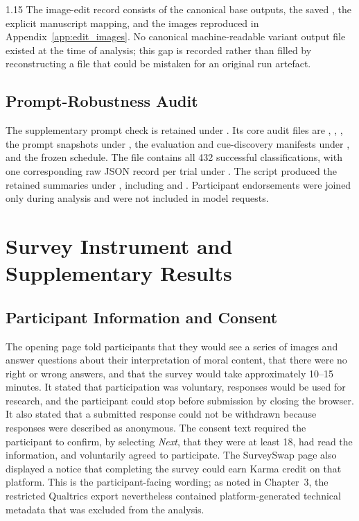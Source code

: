 \begin{spacing}{1.15}
The image-edit record consists of the canonical base outputs, the saved
, the explicit manuscript mapping,
and the images reproduced in Appendix~\ref{app:edit_images}. No canonical
machine-readable variant output file existed at the time of analysis; this gap
is recorded rather than filled by reconstructing a file that could be mistaken
for an original run artefact.

\section{Prompt-Robustness Audit}

The supplementary prompt check is retained under
. Its core audit files are
, ,
, the prompt snapshots under , the
evaluation and cue-discovery manifests under , and the frozen
schedule. The file  contains all
432 successful classifications, with one corresponding raw JSON record per
trial under . The script
 produced the retained summaries under
, including  and
. Participant endorsements were joined only during
analysis and were not included in model requests.
\end{spacing}


\chapter{Survey Instrument and Supplementary Results}
\label{app:survey_supplement}

\section{Participant Information and Consent}

The opening page told participants that they would see a series of images and
answer questions about their interpretation of moral content, that there were
no right or wrong answers, and that the survey would take approximately
10--15 minutes. It stated that participation was voluntary, responses would be
used for research, and the participant could stop before submission by closing
the browser. It also stated that a submitted response could not be withdrawn
because responses were described as anonymous. The consent text required the
participant to confirm, by selecting \textit{Next}, that they were at least 18,
had read the information, and voluntarily agreed to participate. The
SurveySwap page also displayed a notice that completing the survey could earn
Karma credit on that platform. This is the participant-facing wording; as noted
in Chapter~3, the restricted Qualtrics export nevertheless contained
platform-generated technical metadata that was excluded from the analysis.

